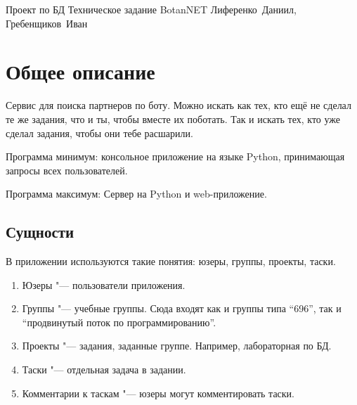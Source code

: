 \documentclass[12pt,a4paper,notitlepage]{article}
\begin{document}
\BigHeader
{Проект по БД}
{Техническое задание BotanNET}
{Лиференко~Даниил, Гребенщиков~Иван}

\section{Общее описание}

Сервис для поиска партнеров по боту.
Можно искать как тех, кто ещё не сделал те же задания, что и ты, чтобы вместе их поботать.
Так и искать тех, кто уже сделал задания, чтобы они тебе расшарили.

Программа минимум: консольное приложение на языке Python, принимающая запросы всех пользователей.

Программа максимум: Сервер на Python и web-приложение.

\subsection{Сущности}
В приложении используются такие понятия: юзеры, группы, проекты, таски.

\begin{enumerate}
\item Юзеры "--- пользователи приложения.
\item Группы "--- учебные группы. Сюда входят как и группы типа ``696'', так и ``продвинутый поток по программированию''.
\item Проекты "--- задания, заданные группе. Например, лабораторная по БД.
\item Таски "--- отдельная задача в задании.
\item Комментарии к таскам "--- юзеры могут комментировать таски.
\end{enumerate}
\end{document}
